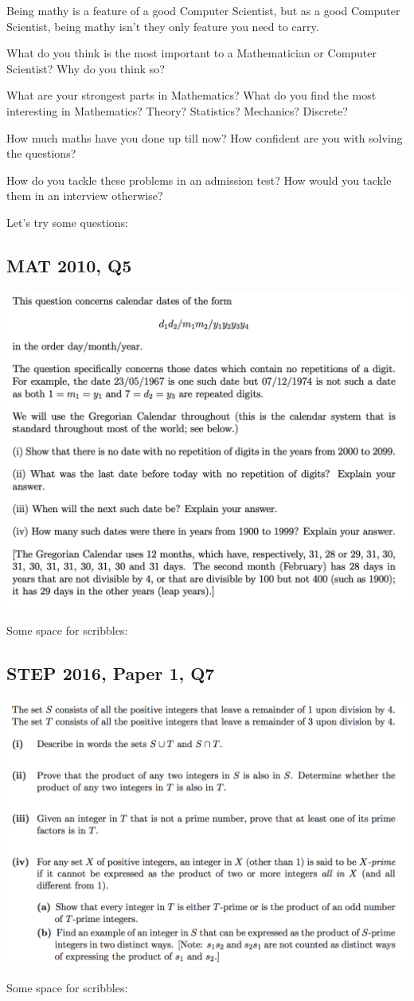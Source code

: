 \documentclass[12pt]{article}
\begin{document}
Being mathy is a feature of a good Computer Scientist, but as a good Computer Scientist, being mathy isn't they only feature you need to carry.

What do you think is the most important to a Mathematician or Computer Scientist? Why do you think so?

What are your strongest parts in Mathematics? What do you find the most interesting in Mathematics? Theory? Statistics? Mechanics? Discrete?

How much maths have you done up till now? How confident are you with solving the questions?

How do you tackle these problems in an admission test? How would you tackle them in an interview otherwise?

Let's try some questions:

\subsection{MAT 2010, Q5}

\begin{center}
    \includegraphics[scale=0.62]{date.png}
\end{center}

Some space for scribbles:

\subsection{STEP 2016, Paper 1, Q7}

\begin{center}
    \includegraphics[scale=0.63]{settheory.png}
\end{center}

Some space for scribbles:
\end{document}
